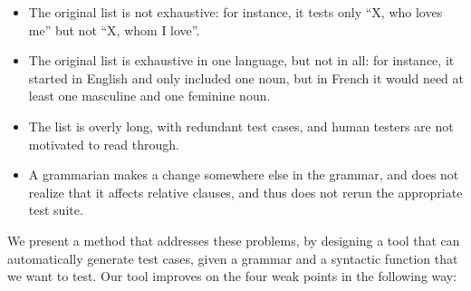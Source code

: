 \documentclass[11pt]{article}
\begin{document}

\begin{itemize}
\item The original list is not exhaustive: for instance, it tests only
``X, who loves me'' but not ``X, whom I love''. 
\item The original list is exhaustive in one language, but not in all:
for instance, it started in English and only included one noun, but in
French it would need at least one masculine and one feminine noun. 
\item The list is overly long, with redundant test cases, and human
testers are not motivated to read through. 
\item A grammarian makes a change somewhere else in the grammar, and
does not realize that it affects relative clauses, and thus does not
rerun the appropriate test suite. 
\end{itemize}

We present a method that addresses these problems, by designing a tool that can automatically generate test cases, given a grammar and a syntactic function that we want to test. Our tool improves on the four weak points in the following way:
\end{document}
